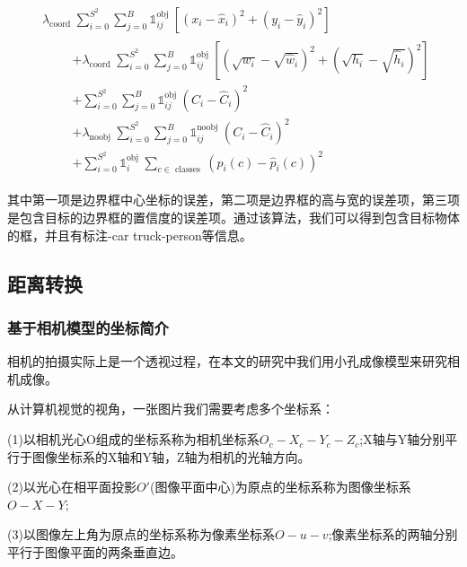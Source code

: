 \begin{equation}
    \begin{aligned}
        &\lambda_{\text {coord }} \sum_{i=0}^{S^{2}} \sum_{j=0}^{B} \mathbb{1}_{i j}^{\text {obj }}\left[\left(x_{i}-\hat{x}_{i}\right)^{2}+\left(y_{i}-\hat{y}_{i}\right)^{2}\right] \\
        &\qquad \begin{aligned}
                    +\lambda_{\text {coord }} \sum_{i=0}^{S^{2}} \sum_{j=0}^{B} \mathbb{1}_{i j}^{\text {obj }}\left[\left(\sqrt{w_{i}}-\sqrt{\hat{w}_{i}}\right)^{2}+\left(\sqrt{h_{i}}-\sqrt{\hat{h}_{i}}\right)^{2}\right] \\
                    +\sum_{i=0}^{S^{2}} \sum_{j=0}^{B} \mathbb{1}_{i j}^{\text {obj }}\left(C_{i}-\hat{C}_{i}\right)^{2} \\
                    +\lambda_{\text {noobj }} \sum_{i=0}^{S^{2}} \sum_{j=0}^{B} \mathbb{1}_{i j}^{\text {noobj }}\left(C_{i}-\hat{C}_{i}\right)^{2} \\
                    +\sum_{i=0}^{S^{2}} \mathbb{1}_{i}^{\text {obj }} \sum_{c \in \text { classes }}\left(p_{i}(c)-\hat{p}_{i}(c)\right)^{2}
        \end{aligned}
    \end{aligned}
\end{equation}

其中第一项是边界框中心坐标的误差，第二项是边界框的高与宽的误差项，第三项是包含目标的边界框的置信度的误差项。通过该算法，我们可以得到包含目标物体的框，并且有标注-car truck-person等信息。

\subsection{距离转换}

\subsubsection{基于相机模型的坐标简介}

相机的拍摄实际上是一个透视过程，在本文的研究中我们用小孔成像模型来研究相机成像。

从计算机视觉的视角，一张图片我们需要考虑多个坐标系：

(1)以相机光心O组成的坐标系称为相机坐标系$O_c-X_c-Y_c-Z_c$;X轴与Y轴分别平行于图像坐标系的X轴和Y轴，Z轴为相机的光轴方向。

(2)以光心在相平面投影$O'$(图像平面中心)为原点的坐标系称为图像坐标系$O-X-Y$;

(3)以图像左上角为原点的坐标系称为像素坐标系$O-u-v$;像素坐标系的两轴分别平行于图像平面的两条垂直边。


